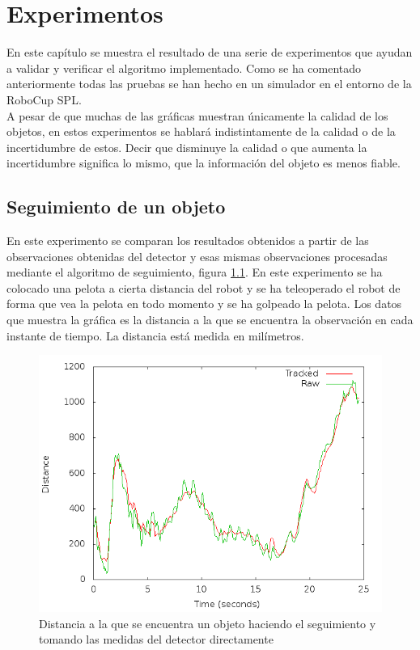 \chapter{Experimentos}
\label{cap:experimentos}

En este capítulo se muestra el resultado de una serie de experimentos que ayudan a validar y verificar el algoritmo implementado. Como se ha comentado anteriormente todas las pruebas se han hecho en un simulador en el entorno de la RoboCup SPL. \\

 A pesar de que muchas de las gráficas muestran únicamente la calidad de los objetos, en estos experimentos se hablará indistintamente de la calidad o de la incertidumbre de estos. Decir que disminuye la calidad o que aumenta la incertidumbre significa lo mismo, que la información del objeto es menos fiable.

\section{Seguimiento de un objeto}
\label{sec:seguimientoobjeto}

En este experimento se comparan los resultados obtenidos a partir de las observaciones obtenidas del detector y esas mismas observaciones procesadas mediante el algoritmo de seguimiento, figura \ref{fig:tracked_vs_raw_plot}. En este experimento se ha colocado una pelota a cierta distancia del robot y se ha teleoperado el robot de forma que vea la pelota en todo momento y se ha golpeado la pelota. Los datos que muestra la gráfica es la distancia a la que se encuentra la observación en cada instante de tiempo. La distancia está medida en milímetros. \\

\begin{figure} [h]
  \begin{center}
    \includegraphics[width=13cm]{img/cap5/tracked_vs_raw_plot}
  \end{center}
  \caption{Distancia a la que se encuentra un objeto haciendo el seguimiento y tomando las medidas del detector directamente}
  \label{fig:tracked_vs_raw_plot}
\end{figure}

